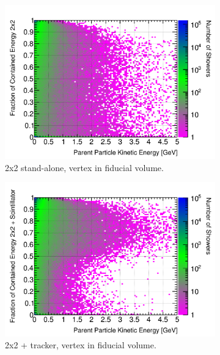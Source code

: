 \documentclass[10pt,a4paper,openany]{article}
\begin{document}
\begin{figure}[htbp]
\begin{subfigure}[b]{0.49\textwidth}
	\end{subfigure}	
	\begin{subfigure}[b]{0.49\textwidth}
		\centering
    \includegraphics[width=1.0\textwidth]{EM_contained_frac_2x2_fiducial.png}
		\caption{2x2 stand-alone, vertex in fiducial volume.}
		\label{}
	\end{subfigure}	
	\hfill
	\begin{subfigure}[b]{0.49\textwidth}
		\centering
		\includegraphics[width=1.0\textwidth]{EM_contained_frac_2x2_Scintillator_fiducial_gap.png}
		\caption{2x2 + tracker, vertex in fiducial volume.}
		\label{}
	\end{subfigure}
	\begin{subfigure}[b]{0.49\textwidth}
		\centering

\end{subfigure}
\end{figure}
\end{document}
